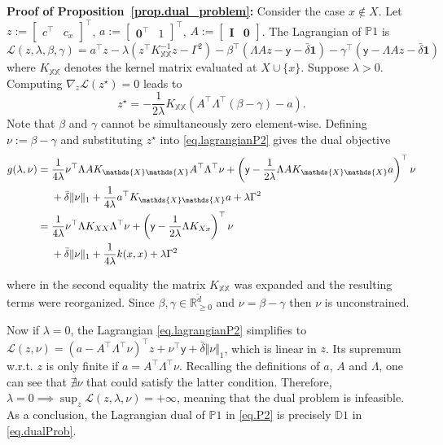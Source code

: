 \begin{my_proof}
	\textbf{Proof of Proposition~\ref{prop.dual_problem}:}
	Consider the case $x \not\in X$. Let $z := \begin{bmatrix} c^\top & c_x\end{bmatrix}^\top$, $a := \begin{bmatrix} \textbf{0}^\top & 1\end{bmatrix}^\top$, $A := \begin{bmatrix} \textbf{I} & \textbf{0}\end{bmatrix}$. The Lagrangian of $\mathds{P}1$ is
	\begin{equation}
		\label{eq.lagrangianP2}
		\mathcal{L}(z,\lambda,\beta,\gamma) = a^\top z - \lambda (z^\top K_{\mathds{X}\mathds{X}}^{-1}z - \Gamma^2) - \beta^\top(\Lambda Az - \mathsf{y} - \bar \delta \textbf{1})- \gamma^\top(\mathsf{y} -\Lambda Az - \bar \delta \textbf{1})
	\end{equation}
	where $K_{\mathds{X}\mathds{X}}$ denotes the kernel matrix evaluated at $X \cup \{x\}$. Suppose $\lambda > 0$. Computing $\nabla_z\mathcal{L}(z^\star) = 0$ leads to
	$$z^\star = -\frac{1}{2\lambda}K_{\mathds{X}\mathds{X}} \left( A^\top \Lambda^\top (\beta - \gamma) - a \right).$$ 
	Note that $\beta$ and $\gamma$ cannot be simultaneously zero element-wise. Defining $\nu := \beta - \gamma$ and substituting $z^\star$ into \eqref{eq.lagrangianP2} gives the dual objective
	\begin{align}\notag
		g(\lambda,\nu) 
		=\;& \frac{1}{4\lambda} \nu^\top \Lambda A K_{\mathds{X}\mathds{X}} A^\top \Lambda^\top \nu + \left(\mathsf{y} - \frac{1}{2\lambda} \Lambda A K_{\mathds{X}\mathds{X}} a \right)^\top \nu \\
		&+ \bar \delta \Vert \nu \Vert_1 +  \frac{1}{4\lambda} a^\top K_{\mathds{X}\mathds{X}} a + \lambda \Gamma^2 \\\notag
		=\;& \frac{1}{4\lambda} \nu^\top \Lambda K_{XX} \Lambda^\top \nu + \left(\mathsf{y} - \frac{1}{2\lambda} \Lambda K_{Xx} \right)^\top \nu \\
		&+ \bar \delta \Vert \nu \Vert_1 +  \frac{1}{4\lambda} k(x,x) + \lambda \Gamma^2 \label{eq.dualDerivation}
	\end{align}

	where in the second equality the matrix $K_{\mathds{X}\mathds{X}}$ was expanded and the resulting terms were reorganized. Since $\beta,\gamma \in \mathbb{R}^{\tilde d}_{\geq 0}$ and $\nu = \beta - \gamma$ then $\nu$ is unconstrained.
	
	Now if $\lambda = 0$, the Lagrangian \eqref{eq.lagrangianP2} simplifies to
	$\mathcal{L}(z,\nu) = (a - A^\top \Lambda^\top \nu)^\top z + \nu^\top \mathsf{y} + \bar\delta \Vert \nu \Vert_1 \label{eq.lamZero}$, which is linear in $z$. Its supremum w.r.t. $z$ is only finite if $a = A^\top\Lambda^\top\nu$. Recalling the definitions of $a$, $A$ and $\Lambda$, one can see that $\nexists \nu$ that could satisfy the latter condition. Therefore, $\lambda = 0 \implies \sup_z \mathcal{L}(z,\lambda,\nu) = +\infty$, meaning that the dual problem is infeasible. As a conclusion, the Lagrangian dual of $\mathds{P}1$ in \eqref{eq.P2} is precisely $\mathds{D}1$ in \eqref{eq.dualProb}.
	

\end{my_proof}
